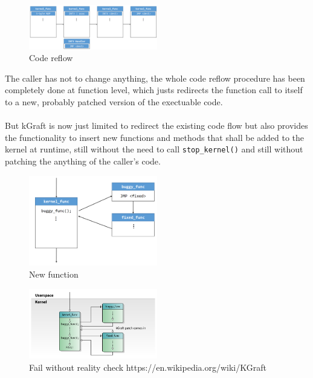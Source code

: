 \documentclass{sig-alternate-05-2015}
\begin{document}
\begin{figure}[ht!]
	\includegraphics[width=0.5\textwidth]{img/kgraft_code_reflow.png}
	\caption{Code reflow \cite{kgfraft-1}}
	\label{fig:kgraft-code-reflow}
\end{figure}

The caller has not to change anything, the whole code reflow procedure has been completely done at function level, which justs redirects the function call to itself to a new, probably patched version of the exectuable code. \\ 
\\
But kGraft is now just limited to redirect the existing code flow but also provides the functionality to insert new functions and methods that shall be added to the kernel at runtime, still without the need to call \texttt{stop\_kernel()} and still without patching the anything of the caller's code.

\begin{figure}[ht!]
	\includegraphics[width=0.5\textwidth]{img/kgraft_new_func.png}
	\caption{New function \cite{kgfraft-1}}
	\label{fig:kgraft-new-func}
\end{figure}


\begin{figure}[ht!]
	\includegraphics[width=0.5\textwidth]{img/kgraft-live-patching-realty-check-1.png}
	\caption{Fail without reality check https://en.wikipedia.org/wiki/KGraft}
	\label{fig:kgraft-real-check-fail}
\end{figure}
\end{document}
